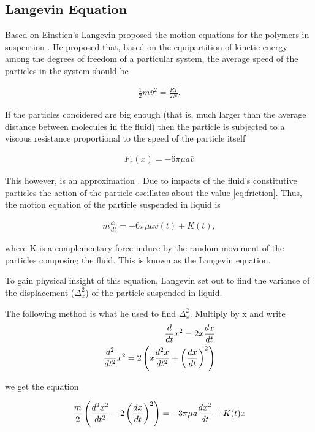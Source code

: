 \subsection{Langevin Equation}

Based on Einstien's \cite{einstein} Langevin proposed the motion equations for the polymers in suspention \cite{langevin_translation}. He proposed that, based on the equipartition of kinetic energy among the degrees of freedom of a particular system, the average speed of the particles in the system should be

\begin{align}
	\frac{1}{2}m\bar{v}^2 = \frac{RT}{2N}.
\end{align}

If the particles concidered are big enough (that is, much larger than the average distance between molecules in the fluid) then the particle is subjected to a viscous resistance proportional to the speed of the particle itself

\begin{align}
	\label{eq:friction}
	F_r(x) = -6\pi\mu a \bar{v}
\end{align}

This however, is an approximation \cite{langevin_original}. Due to impacts of the fluid's constitutive particles the action of the particle oscillates about the value \ref{eq:friction}. Thus, the motion equation of the particle suspended in liquid is

\begin{align}
\label{eq:langevin}
	m\frac{d v}{dt} = -6\pi\mu a v(t) + K(t),
\end{align}

where K is a complementary force induce by the random movement of the particles composing the fluid. This is known as the Langevin equation. 


To gain physical insight of this equation, Langevin \cite{langenvin} set out to find the variance of the displacement ($\Delta_x^2$) of the particle suspended in liquid. 

The following method is what he used to find $\Delta_x^2$. Multiply by x and write
\begin{align}
	\frac{d}{dt}x^2 = 2x\frac{dx}{dt}\\	
	\frac{d^2}{dt^2}x^2 = 2\left({x\frac{d^2x}{dt^2}+\left({\frac{dx}{dt}}\right)^2}\right)
\end{align}


we get the equation

\begin{align}
\label{eq:langevin}
	\frac{m}{2}\left({\frac{d^2x^2}{dt^2} - 2\left({\frac{dx}{dt}}\right)^2}\right) = -3\pi\mu a \frac{d x^2}{dt} + K(t)x
\end{align}

